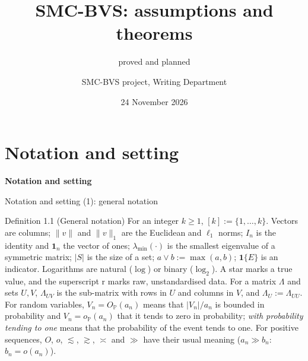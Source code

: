\documentclass[aspectratio=169]{beamer}
\title{SMC-BVS: assumptions and theorems}
\subtitle{proved and planned}
\author{SMC-BVS project, Writing Department}
\institute{}
\date{24 November 2026}
\newcommand{\one}{\mathbf{1}}
\newcommand{\ind}[1]{\mathbf{1}\{#1\}}
\newcommand{\set}[1]{[#1]}
\newcommand{\abs}[1]{\lvert #1\rvert}
\newcommand{\norm}[1]{\lVert #1\rVert}
\renewcommand{\P}{\mathbb{P}}
\newcommand{\OP}{O_{\P}}
\newcommand{\oP}{o_{\P}}
\newcommand{\lmin}{\lambda_{\min}}
\begin{document}
\begin{frame}
\titlepage
\end{frame}

\section{Notation and setting}
\begin{frame}
\centering\Large\textbf{Notation and setting}
\end{frame}

\begin{frame}{Notation and setting (1): general notation}
\footnotesize
\begin{block}{Definition 1.1 (General notation)}
For an integer $k\ge1$, $\set{k}:=\{1,\dots,k\}$. Vectors are columns; $\norm{v}$ and $\norm{v}_1$ are the Euclidean and
$\ell_1$ norms; $I_n$ is the identity and $\one_n$ the vector of ones; $\lmin(\cdot)$ is the smallest eigenvalue of a
symmetric matrix; $\abs{S}$ is the size of a set; $a\vee b:=\max(a,b)$; $\ind{E}$ is an indicator. Logarithms are natural
($\log$) or binary ($\log_2$). A star marks a true value, and the superscript $\mathrm r$ marks raw, unstandardised data.
For a matrix $\Lambda$ and sets $U,V$, $\Lambda_{UV}$ is the sub-matrix with rows in $U$ and columns in $V$, and
$\Lambda_U:=\Lambda_{UU}$. For random variables, $V_n=\OP(a_n)$ means that $\abs{V_n}/a_n$ is bounded in probability and
$V_n=\oP(a_n)$ that it tends to zero in probability; \emph{with probability tending to one} means that the probability of
the event tends to one. For positive sequences, $O$, $o$, $\lesssim$, $\gtrsim$, $\asymp$ and $\gg$ have their usual
meaning ($a_n\gg b_n$: $b_n=o(a_n)$).
\end{block}
\end{frame}
\end{document}
